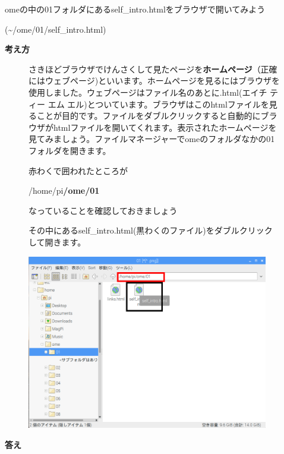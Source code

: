 \documentclass[a4paper,12pt]{jarticle}
\begin{document}
omeの中の01フォルダにあるself\_intro.htmlをブラウザで開いてみよう

(\~{}/ome/01/self\_intro.html)

\textbf{考え方}



\begin{figure}[hb]
  \centering
  \begin{minipage}{16.576cm}
    さきほどブラウザでけんさくして見たページを\textbf{ホームページ}（正確にはウェブページ)といいます。ホームページを見るにはブラウザを使用しました。ウェブページはファイル名のあとに.html(エイチ
    ティー エム
    エル)とついています。ブラウザはこのhtmlファイルを見ることが目的です。ファイルをダブルクリックすると自動的にブラウザがhtmlファイルを開いてくれます。表示されたホームページを見てみましょう。ファイルマネージャーでomeのフォルダなかの01フォルダを開きます。

    赤わくで囲われたところが

    /home/pi\textbf{/ome/01}

    なっていることを確認しておきましょう

    その中にあるself\_intro.html(黒わくのファイル)をダブルクリックして開きます。




    \bigskip
  \end{minipage}

  \includegraphics[width=10.559cm,height=7.634cm]{textbook-img141.png}

\end{figure}

\bigskip

\clearpage
\textbf{答え}
\end{document}
